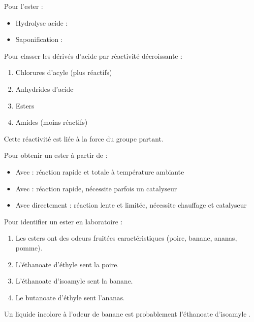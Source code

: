 \begin{exemple}
Pour l'ester  :
\begin{itemize}
    \item Hydrolyse acide : 
    \item Saponification : 
\end{itemize}
\end{exemple}

Pour classer les dérivés d'acide par réactivité décroissante :
\begin{enumerate}
    \item Chlorures d'acyle (plus réactifs)
    \item Anhydrides d'acide
    \item Esters
    \item Amides (moins réactifs)
\end{enumerate}
Cette réactivité est liée à la force du groupe partant.

\begin{exemple}
Pour obtenir un ester  à partir de  :
\begin{itemize}
    \item Avec  : réaction rapide et totale à température ambiante
    \item Avec  : réaction rapide, nécessite parfois un catalyseur
    \item Avec  directement : réaction lente et limitée, nécessite chauffage et catalyseur
\end{itemize}
\end{exemple}

Pour identifier un ester en laboratoire :
\begin{enumerate}
    \item Les esters ont des odeurs fruitées caractéristiques (poire, banane, ananas, pomme).
    \item L'éthanoate d'éthyle sent la poire.
    \item L'éthanoate d'isoamyle sent la banane.
    \item Le butanoate d'éthyle sent l'ananas.
\end{enumerate}

\begin{exemple}
Un liquide incolore à l'odeur de banane est probablement l'éthanoate d'isoamyle .
\end{exemple}

